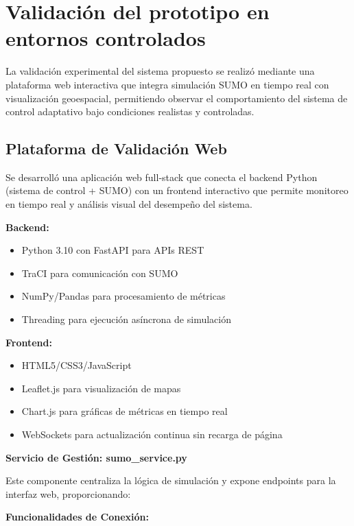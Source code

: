 \documentclass[12pt,a4paper,oneside]{report}
\begin{document}
\section{Validación del prototipo en entornos controlados}\label{validaciuxf3n-del-prototipo-en-entornos-controlados}

La validación experimental del sistema propuesto se realizó mediante una plataforma web interactiva que integra simulación SUMO en tiempo real con visualización geoespacial, permitiendo observar el comportamiento del sistema de control adaptativo bajo condiciones realistas y controladas.

\subsection{Plataforma de Validación Web}\label{plataforma-de-validaciuxf3n-web}

Se desarrolló una aplicación web full-stack que conecta el backend Python (sistema de control + SUMO) con un frontend interactivo que permite monitoreo en tiempo real y análisis visual del desempeño del sistema.

\textbf{Backend:}

\begin{itemize}
\item
  Python 3.10 con FastAPI para APIs REST
\item
  TraCI para comunicación con SUMO
\item
  NumPy/Pandas para procesamiento de métricas
\item
  Threading para ejecución asíncrona de simulación
\end{itemize}

\textbf{Frontend:}

\begin{itemize}
\item
  HTML5/CSS3/JavaScript
\item
  Leaflet.js para visualización de mapas
\item
  Chart.js para gráficas de métricas en tiempo real
\item
  WebSockets para actualización continua sin recarga de página
\end{itemize}

\textbf{Servicio de Gestión: sumo\_service.py}

Este componente centraliza la lógica de simulación y expone endpoints para la interfaz web, proporcionando:

\textbf{Funcionalidades de Conexión:}
\end{document}

